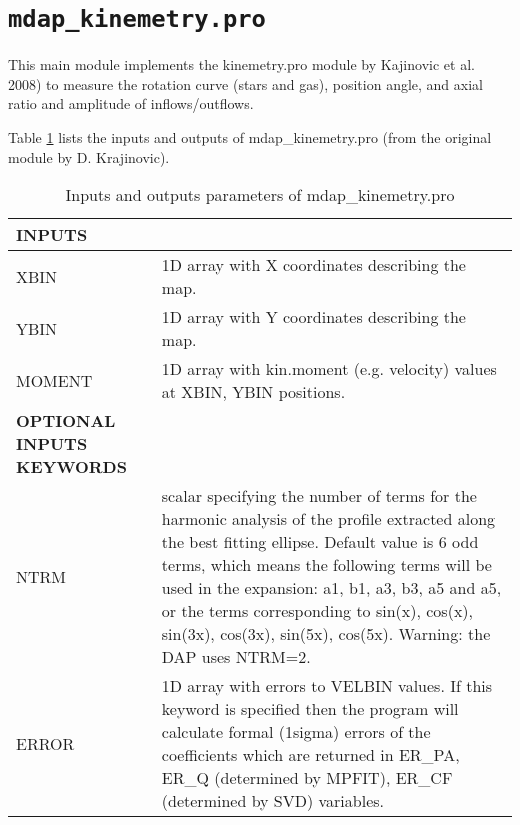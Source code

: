 \section{{\tt mdap\_kinemetry.pro}}
\label{dap_sec:mdap_kinemetry}

This main module implements the kinemetry.pro module by Kajinovic et
al. 2008) to measure the rotation curve (stars and gas), position angle, and axial ratio and amplitude of
inflows/outflows.

Table \ref{dap_tab:mdap_kinemetry} lists the inputs and outputs of
mdap\_kinemetry.pro (from the original module by D. Krajinovic).


\begin{center}
\begin{longtable}{p{2.7cm}| p{11.1cm}}
\caption{Inputs and outputs parameters of
  mdap\_kinemetry.pro} \label{dap_tab:mdap_kinemetry}
\\ \hline \endfirsthead

\hline
\endhead

\hline
\endlastfoot

\hline
{\bf  INPUTS} &  \\
\hline
%
XBIN   & 1D array with X coordinates describing the map.\\
%
YBIN  & 1D array with Y coordinates describing the map.\\
%
MOMENT & 1D array with kin.moment (e.g. velocity) values  at XBIN, YBIN positions.\\
%
\hline
{\bf  OPTIONAL INPUTS KEYWORDS  } &  \\
\hline
NTRM  & scalar specifying the number of terms for the harmonic analysis 
	           of the profile extracted along the best fitting ellipse. Default
	           value is 6 odd terms, which means the following terms will be 
	           used in the expansion: a1, b1, a3, b3, a5 and a5, or the terms
                   corresponding to sin(x), cos(x), sin(3x), cos(3x), sin(5x), cos(5x).
                    Warning: the DAP uses NTRM=2.\\
%
ERROR & 1D array with errors to VELBIN values. If this
             keyword is specified then the program will calculate
	           formal (1sigma) errors of the coefficients which are
	           returned in ER\_PA, ER\_Q (determined by MPFIT), ER\_CF 
	           (determined by SVD) variables. 


\end{longtable}
\end{center}
